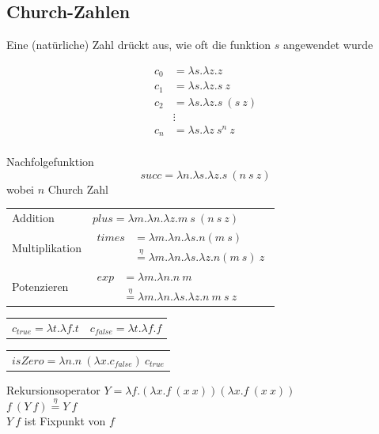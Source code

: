 \documentclass{Zusammenfassung}
\begin{document}
\subsection{Church-Zahlen}\label{subsec:church-zahlen}
Eine (natürliche) Zahl drückt aus, wie oft die funktion $s$ angewendet wurde\\
    \begin{multicols}{2}
        \begin{equation*}
            \begin{aligned}
                c_0 &= \lambda s.\lambda z.z\\
                c_1 &= \lambda s.\lambda z.s\ z\\
                c_2 &= \lambda s. \lambda z.s\ (s\ z)\\
                &\vdots\\
                c_n &= \lambda s. \lambda z\ s^n\ z
        \end{aligned}\label{eq:equation}
        \end{equation*}
        \columnbreak\\
        Nachfolgefunktion \[succ = \lambda n.\lambda s.\lambda z.s\ (n\ s\ z)\]
        wobei $n$ Church Zahl
    \end{multicols}
\begin{table}[H]
    \centering
    \begin{tabularx}{\textwidth}{lX}
        Addition & $plus = \lambda m.\lambda n.\lambda z.m\ s\ (n\ s\ z)$\\
        Multiplikation & $\begin{aligned} times &= \lambda m.\lambda n.\lambda s.n(m\ s)\\&\stackrel{\eta}{=} \lambda m.\lambda n.\lambda s.\lambda z.n(m\ s)\ z\end{aligned}$\\
        Potenzieren & $\begin{aligned} exp &= \lambda m.\lambda n.n\ m\\&\stackrel{\eta}{=}\lambda m.\lambda n.\lambda s.\lambda z.n\ m\ s\ z\end{aligned}$\\
    \end{tabularx}\label{tab:table2}
    \begin{tabularx}{\textwidth}{ll}
        $c_{true}= \lambda t.\lambda f.t$ & $c_{false} = \lambda t.\lambda f.f$\\
    \end{tabularx}
    \begin{tabularx}{\textwidth}{l}
    $isZero = \lambda n.n\ (\lambda x.c_{false})\ c_{true}$
    \end{tabularx}
\end{table}
\noindent
    Rekursionsoperator
    $Y =\lambda f.(\lambda x.f\ (x\ x))(\lambda x.f\ (x\ x))$\\
    $f\ (Y\ f)\stackrel{\eta}{=}Y\ f$\\
    $Y\ f$ ist Fixpunkt von $f$\\
\end{document}
